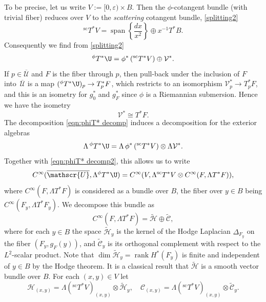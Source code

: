 \documentclass[JEP,XML,SOM,Unicode,NoFloatCountersInSection,published]{cedram}
\theoremstyle{plain}
\theoremstyle{definition}
\newcommand{\Umathbar}{{\overline{\mathscr{U}}}}
\newcommand\calV{{\mathcal V}}
\DeclareMathOperator\rank{rank}
\DeclareMathOperator{\Span}{span}
\newcommand{\Cinf}{C^\infty}
\newcommand{\phiT}{{}^\phi T}
\newcommand{\scT}{{}^{\mathrm{sc}}T}
\let\eps\varepsilon
\begin{document}
To be precise, let us write $V:= [0,\eps)\times B$.
Then the $\phi$-cotangent bundle (with trivial fiber) reduces over $V$ to the
\emph{scattering} cotangent bundle, \cf \eqref{splitting2}
\begin{equation}
\label{eqn:phiT* decomp2}
\scT^*V = \Span \left\{ \frac{dx}{x^2}\right\} \oplus x^{-1} T^*B.
\end{equation}
Consequently we find from \eqref{splitting2}
\begin{equation}
\label{eqn:phiT* decomp}
{}^\phi T^*\U = \phi^* \left(\scT^*V\right) \oplus \calV^*.
\end{equation}
If $p\in \overline{\mathscr{U}}$ and $F$ is the fiber through $p$, then pull-back under the inclusion of $F$ into~$\overline{\mathscr{U}}$ is a map $(\phiT^*\U)_p\to T_p^*F$, which restricts to an isomorphism $\calV^*_p\to T^*_pF$, and this is an isometry for $g_0^*$ and $g_F^*$ since $\phi$ is a Riemannian submersion. Hence we have the isometry
\begin{equation} \label{eqn:V T*F identif}
\calV^* \cong T^*F.
\end{equation}
The decomposition \eqref{eqn:phiT* decomp} induces a decomposition
for the exterior algebras
\begin{equation}
\label{eqn:Lambda decomp}
\Lambda\,\phiT^*\U =
\Lambda \,\phi^*\left(\scT^*V\right) \otimes \Lambda \calV^*.
\end{equation}
Together with \eqref{eqn:phiT* decomp2}, this allows us to write
\[
\Cinf(\Umathbar,\Lambda \phiT^*\U) = \Cinf(V, \Lambda\scT^*V \otimes \Cinf(F,\Lambda T^*F)),
\]
where $\Cinf(F,\Lambda T^*F)$ is considered as a bundle over $B$, the fiber over $y\in B$ being $\Cinf(F_y,\Lambda T^*F_y)$.
We decompose this bundle as
\begin{equation}
\label{eqn:Cinf F decomp}
\Cinf(F,\Lambda T^*F) = \widetilde{\mathscr{H}}\oplus\widetilde{\mathscr{C}},
\end{equation}
where for each $y\in B$ the space $\widetilde{\mathscr{H}}_y$ is the kernel of the Hodge Laplacian $\Delta_{F_y}$ on the fiber $(F_y,g_F(y))$, and $\widetilde{\mathscr{C}}_y$ is its orthogonal complement with respect to the $L^2$-scalar product. Note that $\dim\widetilde{\mathscr{H}}_y=\rank H^*(F_y)$ is finite and independent of $y \in B$ by the Hodge theorem.
It is a classical result \cite[Cor.\,9.11]{heatdirac} that $\widetilde{\mathscr{H}}$ is a smooth vector bundle over $B$.
For each $(x,y)\in V$ let
\[
\mathscr{H}_{(x,y)} = \Lambda(\scT^* V)_{(x,y)}\otimes\widetilde{\mathscr{H}}_y,
\quad \mathscr{C}_{(x,y)}= \Lambda(\scT^* V)_{(x,y)}\otimes\widetilde{\mathscr{C}}_y.
\]
\end{document}
